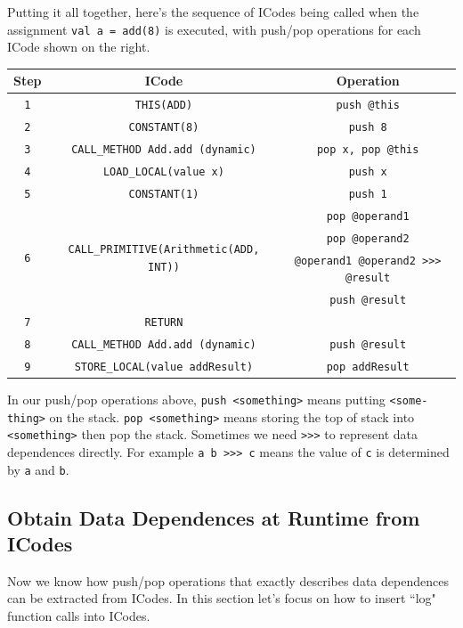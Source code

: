 \documentclass{article}[12pt]
\begin{document}
Putting it all together, here's the sequence of ICodes being called when the assignment \texttt{val a = add(8)} is executed, with push/pop operations for each ICode shown on the right.
\begin{table}[h]
\footnotesize
\begin{tabular}{c|c|c}
\hline
Step & ICode & Operation\\\hline
\texttt{1} & \texttt{THIS(ADD)} & \texttt{push @this}\\\hline
\texttt{2} & \texttt{CONSTANT(8)} & \texttt{push 8}\\\hline
\texttt{3} & \texttt{CALL\_METHOD Add.add (dynamic)} & \texttt{pop x, pop @this}\\\hline
\texttt{4} & \texttt{LOAD\_LOCAL(value x)} & \texttt{push x}\\\hline
\texttt{5} & \texttt{CONSTANT(1)} & \texttt{push 1}\\\hline
\multirow{4}{*}{\texttt{6}} & \multirow{4}{*}{\texttt{CALL\_PRIMITIVE(Arithmetic(ADD, INT))}} & \texttt{pop @operand1} \\
& & \texttt{pop @operand2} \\
& & \texttt{@operand1 @operand2 >>> @result} \\
& & \texttt{push @result}\\\hline
\texttt{7} & \texttt{RETURN} & \\\hline
\texttt{8} & \texttt{CALL\_METHOD Add.add (dynamic)} & \texttt{push @result}\\\hline
\texttt{9} & \texttt{STORE\_LOCAL(value addResult)} & \texttt{pop addResult}\\\hline 
\end{tabular}
\end{table}

In our push/pop operations above, \texttt{push <something>} means putting \texttt{<some-\\thing>} on the stack. \texttt{pop <something>} means storing the top of stack into \texttt{<something>} then pop the stack. Sometimes we need \texttt{>>>} to represent data dependences directly. For example \texttt{a b >>> c} means the value of \texttt{c} is determined by \texttt{a} and \texttt{b}. 


\subsection{Obtain Data Dependences at Runtime from ICodes}
Now we know how push/pop operations that exactly describes data dependences can be extracted from ICodes. In this section let's focus on how to insert ``log" function calls into ICodes. 
\end{document}
